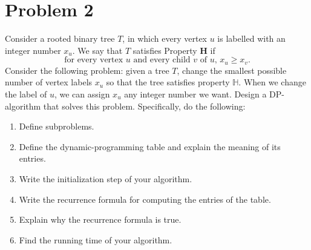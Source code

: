 \section{Problem 2}
Consider a rooted binary tree $T$, in which every vertex $u$ is labelled with an integer number $x_u$. We say that $T$ satisfies Property $\mathbf{H}$ if
\[\text{for every vertex $u$ and every child $v$ of $u$, $x_u \geq x_v$}.\]
Consider the following problem: given a tree $T$, change the smallest possible number of vertex labels $x_u$ so that the tree satisfies property $\mathbb{H}$. When we change the label of $u$, we can assign $x_u$ any integer number we want. Design a DP-algorithm that solves this problem. Specifically, do the following:
\begin{enumerate}
    \item Define subproblems.
    \item Define the dynamic-programming table and explain the meaning of its entries.
    \item Write the initialization step of your algorithm.
    \item Write the recurrence formula for computing the entries of the table. 
    \item Explain why the recurrence formula is true.
    \item Find the running time of your algorithm.
\end{enumerate}
\partbreak
